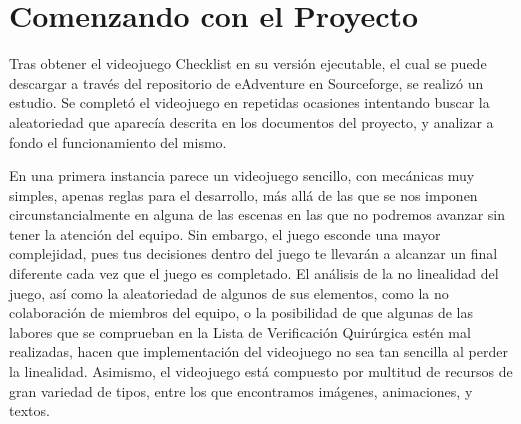 
\cleardoublepage


\chapter{Comenzando con el Proyecto}
\label{comenzando}

Tras obtener el videojuego Checklist en su versión ejecutable, el cual se puede descargar a través del repositorio de eAdventure en Sourceforge, se realizó un estudio. Se completó el videojuego en repetidas ocasiones intentando buscar la aleatoriedad que aparecía descrita en los documentos del proyecto, y analizar a fondo el funcionamiento del mismo. 

En una primera instancia parece un videojuego sencillo, con mecánicas muy simples, apenas reglas para el desarrollo, más allá de las que se nos imponen circunstancialmente en alguna de las escenas en las que no podremos avanzar sin tener la atención del equipo. Sin embargo, el juego esconde una mayor complejidad, pues tus decisiones dentro del juego te llevarán a alcanzar un final diferente cada vez que el juego es completado. El análisis de la no linealidad del juego, así como la aleatoriedad de algunos de sus elementos, como la no colaboración de miembros del equipo, o la posibilidad de que algunas de las labores que se comprueban en la Lista de Verificación Quirúrgica estén mal realizadas, hacen que implementación del videojuego no sea tan sencilla al perder la linealidad. Asimismo, el videojuego está compuesto por multitud de recursos de gran variedad de tipos, entre los que encontramos imágenes, animaciones, y textos. 

